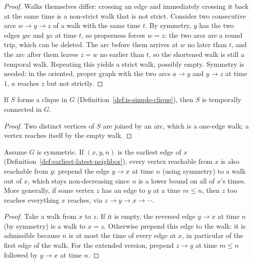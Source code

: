 \begin{proof}
  \leanok
  Walks themselves differ: crossing an edge and immediately crossing it back at
  the same time is a non-strict walk that is not strict. Consider two consecutive
  arcs $w \to y \to z$ of a walk with the same time $t$. By symmetry, $y$ has the
  two edges $yw$ and $yz$ at time $t$, so properness forces $w = z$: the two arcs
  are a round trip, which can be deleted. The arc before them arrives at $w$ no
  later than $t$, and the arc after them leaves $z = w$ no earlier than $t$, so the
  shortened walk is still a temporal walk. Repeating this yields a strict walk,
  possibly empty. Symmetry is needed: in the oriented, proper graph with the two
  arcs $a \to y$ and $y \to z$ at time $1$, $a$ reaches $z$ but not strictly.
\end{proof}

\begin{lemma}
  \label{lem:clique-temporally-connected}
  \leanok
  If $S$ forms a clique in $G$ (Definition~\ref{def:is-simple-clique}), then $S$ is
  temporally connected in $G$.
\end{lemma}

\begin{proof}
  \leanok
  Two distinct vertices of $S$ are joined by an arc, which is a one-edge walk; a vertex reaches itself by the empty walk.
\end{proof}

\begin{lemma}
  \label{lem:reachable-of-earliestEdge}
  \leanok
  Assume $G$ is symmetric. If $(x,y,n)$ is the earliest edge of $x$
  (Definition~\ref{def:earliest-latest-neighbor}), every vertex reachable
  from $x$ is also reachable from $y$: prepend the edge $y \to x$ at time
  $n$ (using symmetry) to a walk out of $x$, which stays non-decreasing
  since $n$ is a lower bound on all of $x$'s times. More generally, if some
  vertex $z$ has an edge to $y$ at a time $m \le n$, then $z$ too reaches
  everything $x$ reaches, via $z \to y \to x \to \cdots$.
\end{lemma}

\begin{proof}
  \leanok
  Take a walk from $x$ to $z$. If it is empty, the reversed edge $y \to x$ at time $n$ (by symmetry) is a walk to $x = z$. Otherwise prepend this edge to the walk: it is admissible because $n$ is at most the time of every edge at $x$, in particular of the first edge of the walk. For the extended version, prepend $z \to y$ at time $m \le n$ followed by $y \to x$ at time $n$.
\end{proof}

